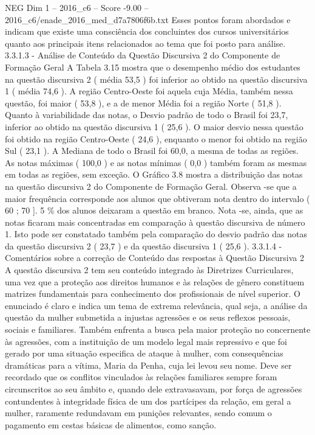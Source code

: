 \begin{textsample}{NEG Dim 1 – 2016\_c6 – Score -9.00 – 2016\_c6/enade\_2016\_med\_d7a7806f6b.txt}
Esses pontos foram abordados e indicam que existe uma consciência dos concluintes dos cursos universitários quanto aos principais itens relacionados ao tema que foi posto para análise. 3.3.1.3 - Análise de Conteúdo da Questão Discursiva 2 do Componente de Formação Geral A Tabela 3.15 mostra que o desempenho médio dos estudantes na questão discursiva 2 ( média 53,5 ) foi inferior ao obtido na questão discursiva 1 ( média 74,6 ).
A região Centro-Oeste foi aquela cuja Média, também nessa questão, foi maior ( 53,8 ), e a de menor Média foi a região Norte ( 51,8 ).
Quanto à variabilidade das notas, o Desvio padrão de todo o Brasil foi 23,7, inferior ao obtido na questão discursiva 1 ( 25,6 ).
O maior desvio nessa questão foi obtido na região Centro-Oeste ( 24,6 ), enquanto o menor foi obtido na região Sul ( 23,1 ).
A Mediana de todo o Brasil foi 60,0, a mesma de todas as regiões.
As notas máximas ( 100,0 ) e as notas mínimas ( 0,0 ) também foram as mesmas em todas as regiões, sem exceção.
O Gráfico 3.8 mostra a distribuição das notas na questão discursiva 2 do Componente de Formação Geral.
Observa -se que a maior frequência corresponde aos alunos que obtiveram nota dentro do intervalo ( 60 ; 70 ]. 5 \% dos alunos deixaram a questão em branco.
Nota -se, ainda, que as notas ficaram mais concentradas em comparação à questão discursiva de número 1.
Isto pode ser constatado também pela comparação do desvio padrão das notas da questão discursiva 2 ( 23,7 ) e da questão discursiva 1 ( 25,6 ). 3.3.1.4 - Comentários sobre a correção de Conteúdo das respostas à Questão Discursiva 2 A questão discursiva 2 tem seu conteúdo integrado às Diretrizes Curriculares, uma vez que a proteção aos direitos humanos e às relações de gênero constituem matrizes fundamentais para conhecimento dos profissionais de nível superior.
O enunciado é claro e indica um tema de extrema relevância, qual seja, a análise da questão da mulher submetida a injustas agressões e os seus reflexos pessoais, sociais e familiares.
Também enfrenta a busca pela maior proteção no concernente às agressões, com a instituição de um modelo legal mais repressivo e que foi gerado por uma situação especifica de ataque à mulher, com consequências dramáticas para a vítima, Maria da Penha, cuja lei levou seu nome.
Deve ser recordado que os conflitos vinculados às relações familiares sempre foram circunscritos ao seu âmbito e, quando dele extravasavam, por força de agressões contundentes à integridade física de um dos partícipes da relação, em geral a mulher, raramente redundavam em punições relevantes, sendo comum o pagamento em cestas básicas de alimentos, como sanção.

\end{textsample}
